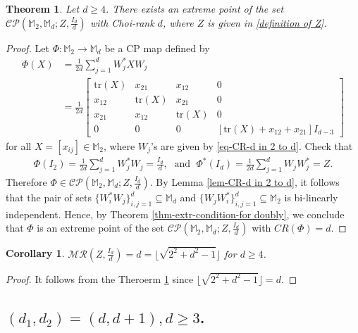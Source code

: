 \documentclass[10pt,reqno]{amsart}
\theoremstyle{definition}
\theoremstyle{plain}
\newtheorem{thm}[defn]{Theorem}
\newtheorem{cor}[defn]{Corollary}
\theoremstyle{remark}
\newcommand{\mbb}[1]{\mathbb{#1}}
\newcommand{\msc}[1]{\mathscr{#1}}
\newcommand{\M}[1]{\mbb{M}_{#1}}%
\newcommand{\Matrix}[1]{\begin{bmatrix}#1\end{bmatrix}}
\numberwithin{equation}{section}%
\begin{document}
\begin{thm}\label{thm- CR-d- 2 to d}
	Let $d\geq 4$. There exists an extreme point of the set $\msc{CP}(\M{2},\M{d}; Z, \frac{I_{d}}{d})$ with Choi-rank $d$, where $Z$ is given in \eqref{definition of Z}.
\end{thm}


\begin{proof}
	Let $\Phi:\M{2}\to\M{d}$ be a CP map defined by
	\begin{align*}
		\Phi(X)
		&=\frac{1}{2d}\sum_{j=1}^{d}W_j^*XW_j\\
		&=\frac{1}{2d}\Matrix{\text{tr}(X)&x_{21}&x_{12}&0\\
			x_{12}&\text{tr}(X)&x_{21}&0\\
			x_{21}&x_{12}&\text{tr}(X)&0\\
			0&0&0&\left[\text{tr}(X)+x_{12}+x_{21}\right]I_{d-3}}
	\end{align*}
	for all $X=[x_{ij}]\in\M{2}$, where $W_j$'s are given by \eqref{eq-CR-d in 2 to d}. Check that
	\begin{align*}
		\Phi(I_2)=\frac{1}{2d}\sum_{j=1}^dW_j^*W_j=\frac{I_{d}}{d},\; \text{ and }\; \Phi^*(I_d)=\frac{1}{2d}\sum_{j=1}^dW_jW_j^*=Z.
	\end{align*}
	Therefore $\Phi\in\msc{CP}(\M{2},\M{d}; Z, \frac{I_{d}}{d})$. By Lemma \ref{lem-CR-d in 2 to d}, it follows that the pair of sets $\{W_i^*W_j\}_{i,j=1}^d\subseteq\M{d}$ and $\{W_jW_i^*\}_{i,j=1}^d\subseteq\M{2}$ is bi-linearly independent. Hence, by Theorem \ref{thm-extr-condition-for doubly}, we conclude that $\Phi$ is an extreme point of the set $\msc{CP}(\M{2},\M{d}; Z, \frac{I_{d}}{d})$ with $CR(\Phi)=d$. 
\end{proof}


\begin{cor}
	$\msc{MR}(Z, \frac{I_{d}}{d})=d=\lfloor{\sqrt{2^2+d^2-1}}\rfloor$ for $d\geq 4$.
\end{cor}

\begin{proof}
	It follows from the Theroerm \ref{thm- CR-d- 2 to d} since $\lfloor{\sqrt{2^2+d^2-1}}\rfloor=d$.
\end{proof}



\begin{center}
	\item \subsection{$(d_1,d_2)=(d,d+1), d\geq 3$.}
\end{center}
\end{document}
